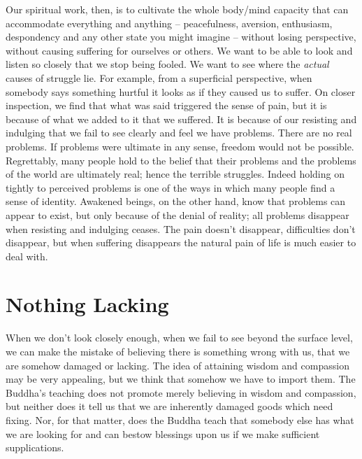 Our spiritual work, then, is to cultivate the whole body/mind capacity
that can accommodate everything and anything – peacefulness, aversion,
enthusiasm, despondency and any other state you might imagine – without
losing perspective, without causing suffering for ourselves or others.
We want to be able to look and listen so closely that we stop being
fooled. We want to see where the \emph{actual} causes of struggle lie. For
example, from a superficial perspective, when somebody says something
hurtful it looks as if they caused us to suffer. On closer inspection,
we find that what was said triggered the sense of pain, but it is
because of what we added to it that we suffered. It is because of our
resisting and indulging that we fail to see clearly and feel we have
problems. There are no real problems. If problems were ultimate in any
sense, freedom would not be possible. Regrettably, many people hold to
the belief that their problems and the problems of the world are
ultimately real; hence the terrible struggles. Indeed holding on tightly
to perceived problems is one of the ways in which many people find a
sense of identity. Awakened beings, on the other hand, know that
problems can appear to exist, but only because of the denial of reality;
all problems disappear when resisting and indulging ceases. The pain
doesn’t disappear, difficulties don’t disappear, but when suffering
disappears the natural pain of life is much easier to deal with.

\section{Nothing Lacking}

When we don’t look closely enough, when we fail to see beyond the
surface level, we can make the mistake of believing there is something
wrong with us, that we are somehow damaged or lacking. The idea of
attaining wisdom and compassion may be very appealing, but we think that
somehow we have to import them. The Buddha’s teaching does not promote
merely believing in wisdom and compassion, but neither does it tell us
that we are inherently damaged goods which need fixing. Nor, for that
matter, does the Buddha teach that somebody else has what we are looking
for and can bestow blessings upon us if we make sufficient
supplications.

